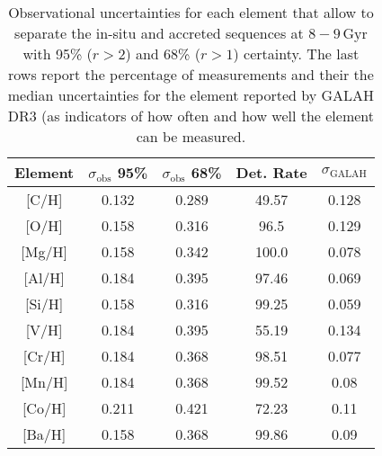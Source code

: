 \begin{table}
    \centering
    \caption{Observational uncertainties for each element that allow to separate the in-situ and accreted sequences at $8-9\,\mathrm{Gyr}$ with 95\% ($r>2$) and 68\% ($r>1$) certainty. The last rows report the percentage of measurements and their the median uncertainties for the element reported by GALAH DR3 (as indicators of how often and how well the element can be measured.}
    \begin{tabular}{ccccc}
    \hline
    Element & $\sigma_\text{obs}$ 95\% & $\sigma_\text{obs}$ 68\% & Det. Rate & $\sigma_\text{GALAH}$ \\
    \hline \hline
    {[C/H]}  & 0.132 & 0.289 & 49.57 & 0.128 \\
    {[O/H]}  & 0.158 & 0.316 & 96.5 & 0.129 \\
    {[Mg/H]}  & 0.158 & 0.342 & 100.0 & 0.078 \\
    {[Al/H]}  & 0.184 & 0.395 & 97.46 & 0.069 \\
    {[Si/H]}  & 0.158 & 0.316 & 99.25 & 0.059 \\
    {[V/H]}  & 0.184 & 0.395 & 55.19 & 0.134 \\
    {[Cr/H]}  & 0.184 & 0.368 & 98.51 & 0.077 \\
    {[Mn/H]}  & 0.184 & 0.368 & 99.52 & 0.08 \\
    {[Co/H]}  & 0.211 & 0.421 & 72.23 & 0.11 \\
    {[Ba/H]}  & 0.158 & 0.368 & 99.86 & 0.09 \\
    \hline
    \end{tabular}
    \label{tab:uncertainties}
\end{table}
